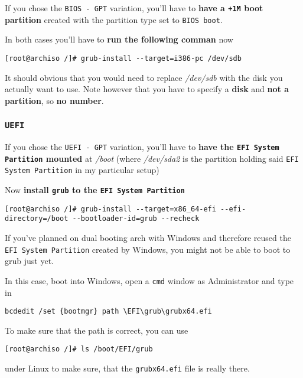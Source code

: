 \documentclass[9pt]{report}
\newenvironment{NOTE}
{\begin{tcolorbox}[colback=admonitionBG,coltitle=draculaFG,colframe=draculaBlue,colbacktitle=draculaBlue,title=NOTE]}
{\end{tcolorbox}}
\newenvironment{IMPORTANT}
{\begin{tcolorbox}[colback=admonitionBG,coltitle=draculaFG,colframe=draculaRed,colbacktitle=draculaRed,title=IMPORTANT]}
{\end{tcolorbox}}
\begin{document}
If you chose the \texttt{BIOS - GPT} variation, you’ll have to \textbf{have a \texttt{+1M} boot partition} created with the partition type set to \texttt{BIOS boot}.


In both cases you’ll have to \textbf{run the following comman} now


\begin{verbatim}
[root@archiso /]# grub-install --target=i386-pc /dev/sdb
\end{verbatim}

\begin{NOTE}
    It should obvious that you would need to replace \textit{/dev/sdb} with the disk you actually want to use.
    Note however that you have to specify a \textbf{disk} and \textbf{not a partition}, so \textbf{no number}.

\end{NOTE}

\newpage

\hypertarget{x-uefi}{\subsubsection{\texttt{UEFI}}}
If you chose the \texttt{UEFI - GPT} variation, you’ll have to \textbf{have the \texttt{EFI System Partition} mounted} at \textit{/boot} (where \textit{/dev/sda2} is the partition holding said \texttt{EFI System Partition} in my particular setup)


Now \textbf{install \texttt{grub} to the \texttt{EFI System Partition}}


\begin{verbatim}
[root@archiso /]# grub-install --target=x86_64-efi --efi-directory=/boot --bootloader-id=grub --recheck
\end{verbatim}

\begin{IMPORTANT}
    If you’ve planned on dual booting arch with Windows and therefore reused the \texttt{EFI System Partition} created by Windows, you might not be able to boot to grub just yet.


    In this case, boot into Windows, open a \texttt{cmd} window as Administrator and type in


    \begin{verbatim}
bcdedit /set {bootmgr} path \EFI\grub\grubx64.efi
    \end{verbatim}

    To make sure that the path is correct, you can use


    \begin{verbatim}
[root@archiso /]# ls /boot/EFI/grub
    \end{verbatim}

    under Linux to make sure, that the \texttt{grubx64.efi} file is really there.

\end{IMPORTANT}
\end{document}
